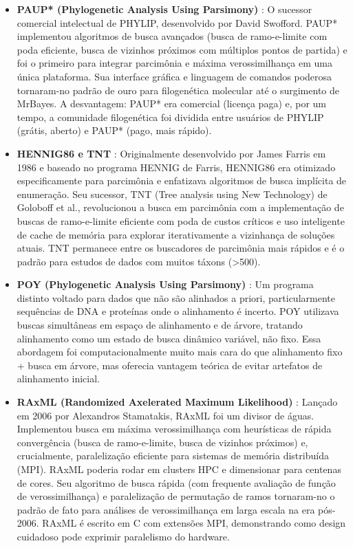\begin{itemize}
\item \textbf{PAUP* (Phylogenetic Analysis Using Parsimony)} \parencite{swofford1993}: O sucessor comercial intelectual de PHYLIP, desenvolvido por David Swofford. PAUP* implementou algoritmos de busca avançados (busca de ramo-e-limite com poda eficiente, busca de vizinhos próximos com múltiplos pontos de partida) e foi o primeiro para integrar parcimônia e máxima verossimilhança em uma única plataforma. Sua interface gráfica e linguagem de comandos poderosa tornaram-no padrão de ouro para filogenética molecular até o surgimento de MrBayes. A desvantagem: PAUP* era comercial (licença paga) e, por um tempo, a comunidade filogenética foi dividida entre usuários de PHYLIP (grátis, aberto) e PAUP* (pago, mais rápido).

\item \textbf{HENNIG86 e TNT} \parencite{goloboff2008}: Originalmente desenvolvido por James Farris em 1986 e baseado no programa HENNIG de Farris, HENNIG86 era otimizado especificamente para parcimônia e enfatizava algoritmos de busca implícita de enumeração. Seu sucessor, TNT (Tree analysis using New Technology) de Goloboff et al., revolucionou a busca em parcimônia com a implementação de buscas de ramo-e-limite eficiente com poda de custos críticos e uso inteligente de cache de memória para explorar iterativamente a vizinhança de soluções atuais. TNT permanece entre os buscadores de parcimônia mais rápidos e é o padrão para estudos de dados com muitos táxons (>500).

\item \textbf{POY (Phylogenetic Analysis Using Parsimony)} \parencite{wheeler2001}: Um programa distinto voltado para dados que não são alinhados a priori, particularmente sequências de DNA e proteínas onde o alinhamento é incerto. POY utilizava buscas simultâneas em espaço de alinhamento e de árvore, tratando alinhamento como um estado de busca dinâmico variável, não fixo. Essa abordagem foi computacionalmente muito mais cara do que alinhamento fixo + busca em árvore, mas oferecia vantagem teórica de evitar artefatos de alinhamento inicial.

\item \textbf{RAxML (Randomized Axelerated Maximum Likelihood)} \parencite{stamatakis2006}: Lançado em 2006 por Alexandros Stamatakis, RAxML foi um divisor de águas. Implementou busca em máxima verossimilhança com heurísticas de rápida convergência (busca de ramo-e-limite, busca de vizinhos próximos) e, crucialmente, paralelização eficiente para sistemas de memória distribuída (MPI). RAxML poderia rodar em clusters HPC e dimensionar para centenas de cores. Seu algoritmo de busca rápida (com frequente avaliação de função de verossimilhança) e paralelização de permutação de ramos tornaram-no o padrão de fato para análises de verossimilhança em larga escala na era pós-2006. RAxML é escrito em C com extensões MPI, demonstrando como design cuidadoso pode exprimir paralelismo do hardware.


\end{itemize}
